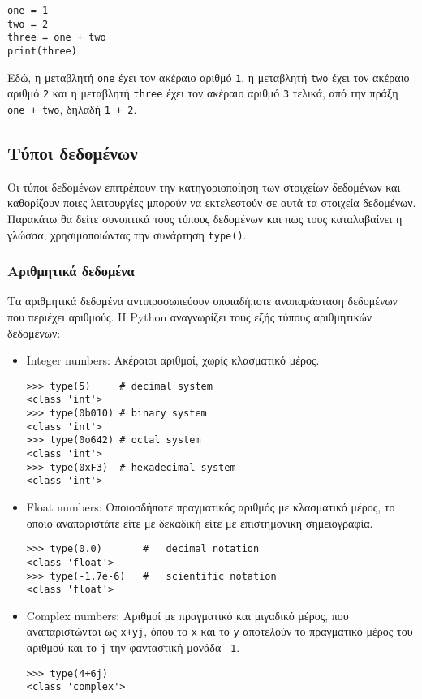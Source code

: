 \documentclass[14pt]{extreport}
\begin{document}
\begin{lstlisting}
one = 1
two = 2
three = one + two
print(three)
\end{lstlisting}

Εδώ, η μεταβλητή \lstinline{one} έχει τον ακέραιο αριθμό \lstinline{1}, η μεταβλητή \lstinline{two} έχει τον ακέραιο αριθμό \lstinline{2} και η μεταβλητή \lstinline{three} έχει τον ακέραιο αριθμό \lstinline{3} τελικά, από την πράξη \lstinline{one + two}, δηλαδή \lstinline{1 + 2}.

\subsection{Τύποι δεδομένων}

Οι τύποι δεδομένων επιτρέπουν την κατηγοριοποίηση των στοιχείων δεδομένων και καθορίζουν ποιες λειτουργίες μπορούν να εκτελεστούν σε αυτά τα στοιχεία δεδομένων. Παρακάτω θα δείτε συνοπτικά τους τύπους δεδομένων και πως τους καταλαβαίνει η γλώσσα, χρησιμοποιώντας την συνάρτηση \lstinline{type()}.

\subsubsection{Αριθμητικά δεδομένα}

Τα αριθμητικά δεδομένα αντιπροσωπεύουν οποιαδήποτε αναπαράσταση δεδομένων που περιέχει αριθμούς. Η Python αναγνωρίζει τους εξής τύπους αριθμητικών δεδομένων:

\begin{itemize}
    \itemsep0cm
    \item Integer numbers: Ακέραιοι αριθμοί, χωρίς κλασματικό μέρος.
          \begin{lstlisting}[numbers=none]
>>> type(5)     # decimal system
<class 'int'>
>>> type(0b010) # binary system
<class 'int'>
>>> type(0o642) # octal system
<class 'int'>
>>> type(0xF3)  # hexadecimal system
<class 'int'>
\end{lstlisting}
    \item Float numbers: Οποιοσδήποτε πραγματικός αριθμός με κλασματικό μέρος, το οποίο αναπαριστάτε είτε με δεκαδική είτε με επιστημονική σημειογραφία.
          \begin{lstlisting}[numbers=none]
>>> type(0.0)       #   decimal notation
<class 'float'>
>>> type(-1.7e-6)   #   scientific notation
<class 'float'>
\end{lstlisting}
    \item Complex numbers: Αριθμοί με πραγματικό και μιγαδικό μέρος, που αναπαριστώνται ως \lstinline{x+yj}, όπου το \lstinline{x} και το \lstinline{y} αποτελούν το πραγματικό μέρος του αριθμού και το \lstinline{j} την φανταστική μονάδα \lstinline{-1}.
          \begin{lstlisting}[numbers=none]
>>> type(4+6j)
<class 'complex'>
\end{lstlisting}
\end{itemize}
\end{document}
